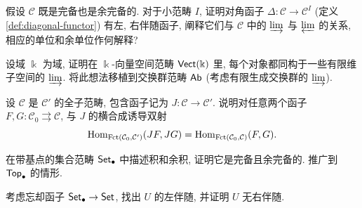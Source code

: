 \begin{Exercises}
	\item 假设 $\mathcal{C}$ 既是完备也是余完备的. 对于小范畴 $I$, 证明对角函子 $\Delta: \mathcal{C} \to \mathcal{C}^I$ (定义 \ref{def:diagonal-functor}) 有左, 右伴随函子, 阐释它们与 $\mathcal{C}$ 中的 $\varinjlim$ 与 $\varprojlim$ 的关系, 相应的单位和余单位作何解释?
	\item 设域 $\Bbbk$ 为域, 证明在 $\Bbbk$-向量空间范畴 $\mathsf{Vect}(\Bbbk)$ 里, 每个对象都同构于一些有限维子空间的 $\varinjlim$. 将此想法移植到交换群范畴 $\mathsf{Ab}$ (考虑有限生成交换群的 $\varinjlim$).
	\item 设 $\mathcal{C}$ 是 $\mathcal{C}'$ 的全子范畴, 包含函子记为 $J: \mathcal{C} \to \mathcal{C}'$. 说明对任意两个函子 $F, G: \mathcal{C}_0 \rightrightarrows \mathcal{C}$, 与 $J$ 的横合成诱导双射
		\[ \operatorname{Hom}_{\text{Fct}(\mathcal{C}_0, \mathcal{C}')}(JF, JG) = \operatorname{Hom}_{\text{Fct}(\mathcal{C}_0, \mathcal{C})}(F, G). \]
	\item 在带基点的集合范畴 $\mathsf{Set}_\bullet$ 中描述积和余积, 证明它是完备且余完备的. 推广到 $\mathsf{Top}_\bullet$ 的情形.
	\item 考虑忘却函子 $\mathsf{Set}_\bullet \to \mathsf{Set}$, 找出 $U$ 的左伴随, 并证明 $U$ 无右伴随.
\end{Exercises}
